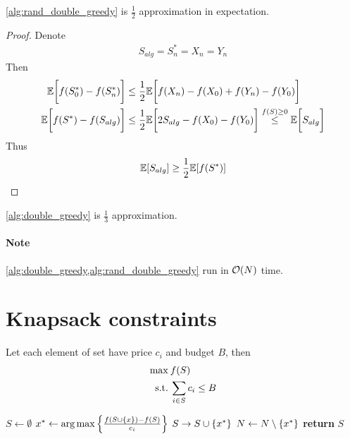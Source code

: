 \begin{theorem}
	\vref{alg:rand_double_greedy} is $\frac{1}{2}$ approximation in expectation.
	\begin{proof}
		Denote 
		\begin{align}
			S_{alg} = S^*_n=X_n=Y_n
		\end{align}
		Then
		\begin{align}
		\mathbb{E} \qty\bigg[f(S^*_{0}) - f(S^*_n)] &\leq \frac{1}{2} \mathbb{E} \qty\bigg[f(X_n) - f(X_{0})+f(Y_n) - f(Y_{0}) ]\\
		\mathbb{E} \qty\bigg[f(S^*) - f(S_{alg})] &\leq \frac{1}{2} \mathbb{E} \qty\bigg[2S_{alg} - f(X_{0}) - f(Y_{0}) ]\stackrel{f(S)\geq 0}{\leq} \mathbb{E} \qty\bigg[S_{alg} ]
		\end{align}
		Thus
		\begin{align}
		\mathbb{E} \qty[S_{alg} ] \geq\frac{1}{2}\mathbb{E} \qty[f(S^*)] 
		\end{align}
		
	\end{proof}

\begin{coll}
	\vref{alg:double_greedy} is $\frac{1}{3}$ approximation.
\end{coll}
\end{theorem}


\paragraph{Note} \vref{alg:double_greedy,alg:rand_double_greedy} run in $\order{N}$ time.


\section{Knapsack constraints}
Let each element of set have price $c_i$ and budget $B$, then
\begin{align}
\max \: & f(S)\\
\text{s.t.} \: & \sum_{i \in S} c_i \leq B
\end{align}


\begin{algorithm}
	\caption{}\label{alg:knapsack_greedy}
	\begin{algorithmic}[1]
		\State $S \gets \emptyset$
		\State $x^* \gets \arg \max \qty{ \frac{f(S\cup \qty{x})-f(S)}{c_i}}$
		\State $S\to S \cup \qty{x^*}$
		\EndIf
		\State $N \gets N\setminus \qty{x^*}$
		\EndWhile
		\State \textbf{return} $S$
		\EndProcedure
	\end{algorithmic}
\end{algorithm}

